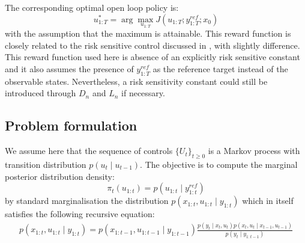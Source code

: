 The corresponding optimal open loop policy is:
\begin{equation}
  u^*_{1:T} = \arg\max_{u_{1:T}} J(u_{1:T};y^{ref}_{1:T};x_0)
\label{eq:optcontrol}
\end{equation}
with the assumption that the maximum is attainable. This reward function is closely related to the risk sensitive control discussed in \cite{WR90}, with slightly difference. This reward function used here is absence of an explicitly risk sensitive constant and it also assumes the presence of $y^{ref}_{1:T}$ as the reference target instead of the observable states. Nevertheless, a risk sensitivity constant could still be introduced through $D_n$ and $L_n$ if necessary.

\subsection{Problem formulation}
We assume here that the sequence of controls $\{U_t\}_{t \geq 0}$ is a Markov process with transition distribution $p(u_t \mid u_{t-1})$. The objective is to compute the marginal posterior distribution density:
\begin{equation}
 \pi_t(u_{1:t}) = p(u_{1:t} \mid y^{ref}_{1:t})
\end{equation} 
by standard marginalisation the distribution $p(x_{1:t}, u_{1:t} \mid y_{1:t})$ which in itself satisfies the following recursive equation:
\begin{align}
  p(x_{1:t}, u_{1:t} \mid y_{1:t}) = p(x_{1:t-1}, u_{1:t-1} \mid y_{1:t-1}) \frac{p(y_t \mid x_t, u_t)p(x_t, u_t \mid x_{t-1}, u_{t-1})}{p(y_t \mid y_{1:t-1})}
\end{align}
 
 
 
